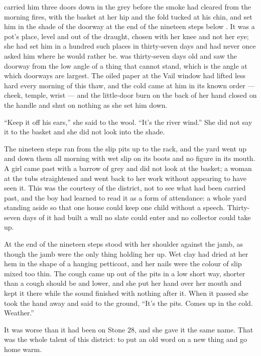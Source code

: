 
 carried him three doors down  in the grey before the smoke had cleared from the morning fires, with the basket at her hip and the fold tucked at his chin, and set him in the shade of the doorway at the end of the nineteen steps below . It was a pot's place, level and out of the draught, chosen with her knee and not her eye; she had set him in a hundred such places in thirty-seven days and had never once asked him where he would rather be.  was thirty-seven days old and saw the doorway from the low angle of a thing that cannot stand, which is the angle at which doorways are largest. The oiled paper at the Vail window had lifted less hard every morning of this thaw, and the cold came at him in its known order --- cheek, temple, wrist --- and the little-door burn on the back of her hand closed on the handle and shut on nothing as she set him down.

“Keep it off his ears,” she said to the wool. “It's the river wind.” She did not say it to the basket and she did not look into the shade.

The nineteen steps ran from the slip pits up to the rack, and the yard went up and down them all morning with wet slip on its boots and no figure in its mouth. A girl came past with a barrow of grey and did not look at the basket; a woman at the tubs straightened and went back to her work without appearing to have seen it. This was the courtesy of the district, not to see what had been carried past, and the boy had learned to read it as a form of attendance: a whole yard standing aside so that one house could keep one child without a speech. Thirty-seven days of it had built a wall no slate could enter and no collector could take up.

At the end of the nineteen steps  stood with her shoulder against the jamb, as though the jamb were the only thing holding her up. Wet clay had dried at her hem in the shape of a hanging petticoat, and her nails were the colour of slip mixed too thin. The cough came up out of the pits in a low short way, shorter than a cough should be and lower, and she put her hand over her mouth and kept it there while the sound finished with nothing after it. When it passed she took the hand away and said to the ground, “It's the pits. Comes up in the cold. Weather.”

It was worse than it had been on Stone 28, and she gave it the same name. That was the whole talent of this district: to put an old word on a new thing and go home warm.

